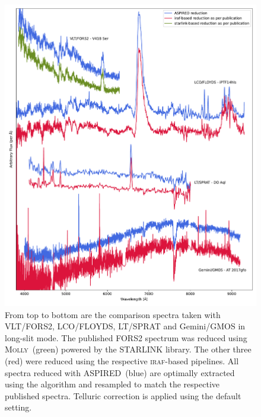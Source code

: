 \documentclass[linenumbers, twocolumn]{aastex631}
\begin{document}
\begin{figure}
    \centering
    \includegraphics[width=\textwidth]{fig_08_reduction_compared.pdf}
    \caption{From top to bottom are the comparison spectra taken with VLT/FORS2,
    LCO/FLOYDS, LT/SPRAT and Gemini/GMOS in long-slit mode. The published FORS2
    spectrum was reduced using \textsc{Molly}~(green) powered by the \textsc{STARLINK}
    library. The other three (red) were reduced using the respective \textsc{iraf}-based
    pipelines. All spectra reduced with \textsc{ASPIRED}~(blue) are optimally extracted using the \citep{1986PASP...98..609H} algorithm and resampled to match
    the respective published spectra. Telluric correction is applied using the default
    setting.}
    \label{fig:reduction_compared}
\end{figure}
\end{document}
